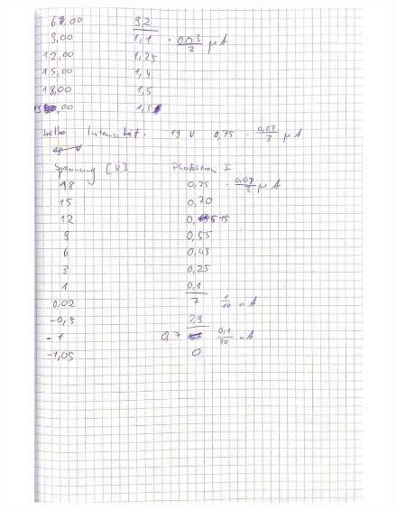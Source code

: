 \begin{figure}[H]
  \centering
  \includegraphics[width=\textwidth]{content/Bilder/IMG_3214.jpeg}
  \label{fig:Messungen_2}
\end{figure}

